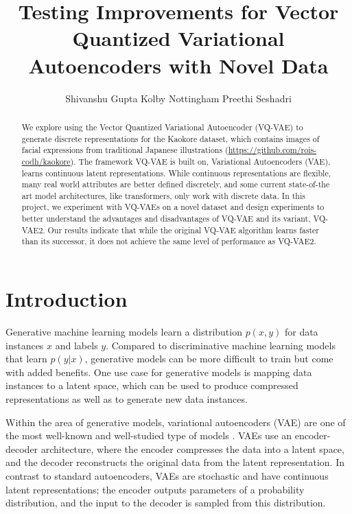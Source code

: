 \documentclass{article}
\title{Testing Improvements for Vector Quantized Variational Autoencoders with Novel Data}
\author{
  Shivanshu Gupta
  \And
  Kolby Nottingham
  \And
  Preethi Seshadri
}
\begin{document}
\maketitle

\begin{abstract}
    We explore using the Vector Quantized Variational Autoencoder (VQ-VAE) to generate discrete representations for the Kaokore dataset, which contains images of facial expressions from traditional Japanese illustrations (\url{https://github.com/rois-codh/kaokore}).
    The framework VQ-VAE is built on, Variational Autoencoders (VAE), learns continuous latent representations.
    While continuous representations are flexible, many real world attributes are better defined discretely, and some current state-of-the art model architectures, like transformers, only work with discrete data. 
    In this project, we experiment with VQ-VAEs on a novel dataset and design experiments to better understand the advantages and disadvantages of VQ-VAE and its variant, VQ-VAE2.
    Our results indicate that while the original VQ-VAE algorithm learns faster than its successor, it does not achieve the same level of performance as VQ-VAE2. 
\end{abstract}

\section{Introduction}

Generative machine learning models learn a distribution $p(x,y)$ for data instances $x$ and labels $y$. Compared to discriminative machine learning models that learn $p(y|x)$, generative models can be more difficult to train but come with added benefits. One use case for generative models is mapping data instances to a latent space, which can be used to produce compressed representations as well as to generate new data instances. 

Within the area of generative models, variational autoencoders (VAE) are one of the most well-known and well-studied type of models \cite{VAE}. VAEs use an encoder-decoder architecture, where the encoder compresses the data into a latent space, and the decoder reconstructs the original data from the latent representation. In contrast to standard autoencoders, VAEs are stochastic and have continuous latent representations; the encoder outputs parameters of a probability distribution, and the input to the decoder is sampled from this distribution.
\end{document}
